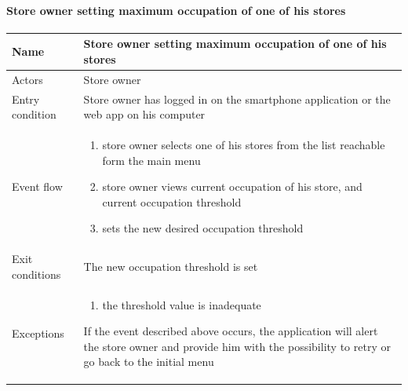 \paragraph{Store owner setting maximum occupation of one of his stores}
\begin{flushleft}
	\begin{tabular} { | m{3cm} | m{10cm} | }
		\hline
		Name & Store owner setting maximum occupation of one of his stores\\
		\hline
		Actors & Store owner\\
		\hline
		Entry condition & Store owner has logged in on the smartphone application or the web app on his computer\\
		\hline
		Event flow & \begin{enumerate}
			\item store owner selects one of his stores from the list reachable form the main menu
			\item store owner views current occupation of his store, and current occupation threshold
			\item sets the new desired occupation threshold
		\end{enumerate}\\
		\hline
		Exit conditions & The new occupation threshold is set\\
		\hline
		Exceptions & \begin{enumerate}
			\item the threshold value is inadequate
		\end{enumerate}
		If the event described above occurs, the application will alert the store owner and provide him with the possibility to retry or go back to the initial menu\\
		\hline
	\end{tabular}
\end{flushleft}